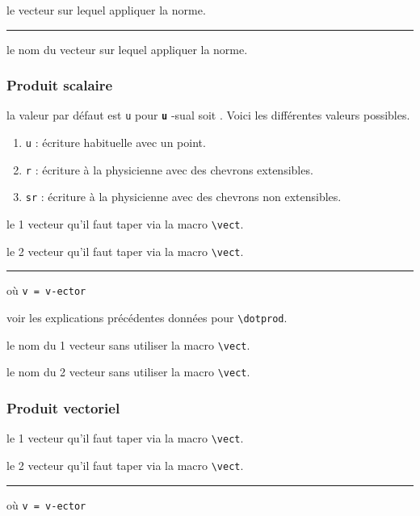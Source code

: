 \documentclass[12pt,a4paper]{article}
\makeatletter
\newcommand\env[1]{\texttt{#1}}
\newcommand\macro[1]{\env{\textbackslash{}#1}}
\theoremstyle{definition}
\newcommand\separation{
	\medskip
	\hfill\rule{0.5\textwidth}{0.75pt}\hfill
	\medskip
}
\newcommand\whyprefix[2]{%
	\textbf{\prefix{#1}}-#2%
}
\newcommand\mwhyprefix[2]{%
	\texttt{#1 = #1-#2}%
}
\newcommand\prefix[1]{%
	\texttt{#1}%
}
\newcommand\inenglish{\@ifstar{\@inenglish@star}{\@inenglish@no@star}}
\newcommand\@inenglish@star[1]{%
	\emph{\og #1 \fg}%
}
\newcommand\@inenglish@no@star[1]{%
	\@inenglish@star{#1} en anglais%
}
\makeatother
\begin{document}
\IDarg{} le vecteur sur lequel appliquer la norme.


\separation


\IDarg{} le nom du vecteur sur lequel appliquer la norme.
\subsubsection{Produit scalaire}


\IDoption{} la valeur par défaut est \verb+u+ pour \whyprefix{u}{sual} soit \inenglish{habituel}.  Voici les différentes valeurs possibles.
\begin{enumerate}
	\item \verb+u+ : écriture habituelle avec un point.

	\item \verb+r+ : écriture \og à la physicienne \fg{} avec des chevrons extensibles.

	\item \verb+sr+ : écriture \og à la physicienne \fg{} avec des chevrons non extensibles.
\end{enumerate}

 le 1\ier{} vecteur qu'il faut taper via la macro \macro{vect}.

 le 2\ieme{} vecteur qu'il faut taper via la macro \macro{vect}.


\separation


 où \quad \mwhyprefix{v}{ector}

\IDoption{} voir les explications précédentes données pour \macro{dotprod}.

 le nom du 1\ier{} vecteur sans utiliser la macro \macro{vect}.

 le nom du 2\ieme{} vecteur sans utiliser la macro \macro{vect}.
\subsubsection{Produit vectoriel}



 le 1\ier{} vecteur qu'il faut taper via la macro \macro{vect}.

 le 2\ieme{} vecteur qu'il faut taper via la macro \macro{vect}.


\separation


 où \quad \mwhyprefix{v}{ector}
\end{document}
